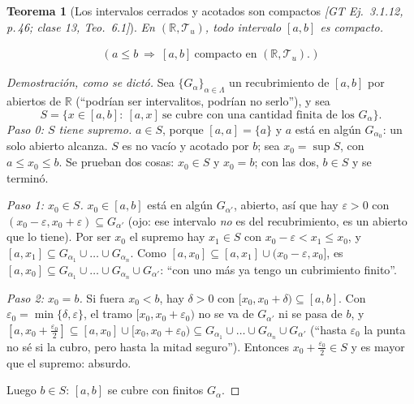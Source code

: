 \documentclass[11pt,a4paper]{article}
\newcommand{\lgc}[1]{\par\vspace{-3pt}\begin{gather*}\big(\;#1\;\big)\end{gather*}\vspace{-6pt}}
\theoremstyle{definition}
\theoremstyle{plain}
\newtheorem{teorema}[definicion]{Teorema}
\newcommand{\fnt}[1]{{\normalfont\small\itshape\color{gray!150!black}[#1]}}
\newcommand{\R}{\mathbb{R}}
\newcommand{\tp}{\mathcal{T}}
\begin{document}
\begin{teorema}[Los intervalos cerrados y acotados son compactos \fnt{GT Ej.\ 3.1.12, p.\,46; clase 13, Teo.\ 6.1}]\label{cp:ab}
En $(\R,\tp_u)$, todo intervalo $[a,b]$ es compacto.
\lgc{a\le b\ \Rightarrow\ [a,b]\ \text{compacto en } (\R,\tp_u).}
\end{teorema}

\begin{proof}[Demostración, como se dictó]
Sea $\{G_\alpha\}_{\alpha\in\Lambda}$ un recubrimiento de $[a,b]$ por abiertos de $\R$ (``podrían ser intervalitos, podrían no serlo''), y sea
\[
S=\{x\in[a,b]:\ [a,x]\ \text{se cubre con una cantidad finita de los } G_\alpha\}.
\]
\emph{Paso 0: $S$ tiene supremo.} $a\in S$, porque $[a,a]=\{a\}$ y $a$ está en algún $G_{\alpha_0}$: un solo abierto alcanza. $S$ es no vacío y acotado por $b$; sea $x_0=\sup S$, con $a\le x_0\le b$. Se prueban dos cosas: $x_0\in S$ y $x_0=b$; con las dos, $b\in S$ y se terminó.

\emph{Paso 1: $x_0\in S$.} $x_0\in[a,b]$ está en algún $G_{\alpha'}$, abierto, así que hay $\varepsilon>0$ con $(x_0-\varepsilon,x_0+\varepsilon)\subseteq G_{\alpha'}$ (ojo: ese intervalo \emph{no} es del recubrimiento, es un abierto que lo tiene). Por ser $x_0$ el supremo hay $x_1\in S$ con $x_0-\varepsilon<x_1\le x_0$, y $[a,x_1]\subseteq G_{\alpha_1}\cup\dots\cup G_{\alpha_n}$. Como $[a,x_0]\subseteq[a,x_1]\cup(x_0-\varepsilon,x_0]$, es $[a,x_0]\subseteq G_{\alpha_1}\cup\dots\cup G_{\alpha_n}\cup G_{\alpha'}$: ``con uno más ya tengo un cubrimiento finito''.

\emph{Paso 2: $x_0=b$.} Si fuera $x_0<b$, hay $\delta>0$ con $[x_0,x_0+\delta)\subseteq[a,b]$. Con $\varepsilon_0=\min\{\delta,\varepsilon\}$, el tramo $[x_0,x_0+\varepsilon_0)$ no se va de $G_{\alpha'}$ ni se pasa de $b$, y $[a,x_0+\frac{\varepsilon_0}2]\subseteq[a,x_0]\cup[x_0,x_0+\varepsilon_0)\subseteq G_{\alpha_1}\cup\dots\cup G_{\alpha_n}\cup G_{\alpha'}$ (``hasta $\varepsilon_0$ la punta no sé si la cubro, pero hasta la mitad seguro''). Entonces $x_0+\frac{\varepsilon_0}2\in S$ y es mayor que el supremo: absurdo.

Luego $b\in S$: $[a,b]$ se cubre con finitos $G_\alpha$.
\end{proof}
\end{document}
